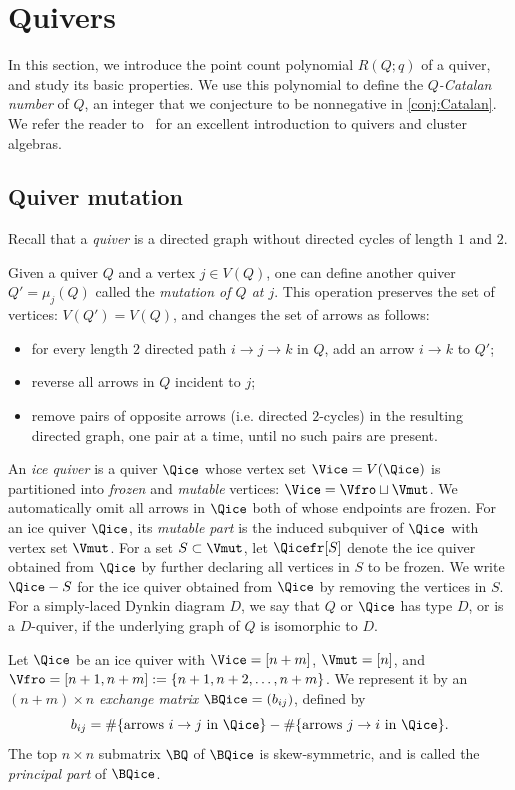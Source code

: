 \section{Quivers}
In this section, we introduce the point count polynomial $R(Q;q)$ of a \Louise %
 quiver, and study its basic properties.  We use this polynomial to define the \emph{$Q$-Catalan number} of $Q$, an integer that we conjecture to be nonnegative in \cref{conj:Catalan}. We refer the reader to~\cite{FWZ_book} for an excellent introduction to quivers and cluster algebras.

\subsection{Quiver mutation}\label{sec:quiver}
Recall that a \emph{quiver} is a directed graph without directed cycles of length $1$ and $2$.

Given a quiver $Q$ and a vertex $j\in V(Q)$, one can define another quiver $Q'=\mu_j(Q)$ called the \emph{mutation of $Q$ at $j$}. This operation preserves the set of vertices:  $V(Q')=V(Q)$, and changes the set of arrows as follows:
\begin{itemize}
\item for every length $2$ directed path $i\to j\to k$ in $Q$, add an arrow $i\to k$ to $Q'$;
\item reverse all arrows in $Q$ incident to $j$;
\item remove pairs of opposite arrows (i.e.  directed $2$-cycles) in the resulting directed graph, one pair at a time, until no such pairs are present.
\end{itemize}

An \emph{ice quiver} is a quiver $\Qice$ whose vertex set $\Vice=V(\Qice)$ is partitioned into \emph{frozen} and \emph{mutable} vertices: $\Vice=\Vfro\sqcup \Vmut$. We automatically omit all arrows in $\Qice$ both of whose endpoints are frozen. For an ice quiver $\Qice$, its \emph{mutable part} is the induced subquiver of $\Qice$ with vertex set $\Vmut$.  %
 For a set $S\subset \Vmut$, let $\Qicefr[S]$ denote the ice quiver obtained from $\Qice$ by further declaring all vertices in $S$ to be frozen. We write $\Qice-S$ for the ice quiver obtained from $\Qice$ by removing the vertices in $S$.  For a simply-laced Dynkin diagram $D$, we say that $Q$ or $\Qice$ has type $D$, or is a $D$-quiver, if the underlying graph of $Q$ is isomorphic to $D$.


 Let $\Qice$ be an ice quiver with $\Vice=[n+m]$, $\Vmut=[n]$, and $\Vfro=[n+1,n+m]:=\{n+1,n+2,\dots,n+m\}$. We represent it by an $(n+m)\times n$ \emph{exchange matrix} $\BQice=(b_{ij})$, defined by
 \begin{equation*}%
   b_{ij}=\#\{\text{arrows $i\to j$ in $\Qice$}\} - \#\{\text{arrows $j\to i$ in $\Qice$}\}.
 \end{equation*}
The top $n\times n$ submatrix $\BQ$ of $\BQice$ is skew-symmetric, and is called the \emph{principal part} of $\BQice$.  
%

